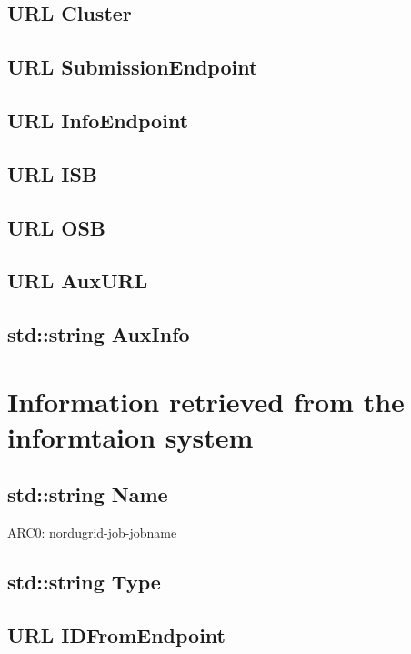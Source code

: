 \documentclass{book}
\begin{document}
\subsection*{URL Cluster}

\subsection*{URL SubmissionEndpoint}

\subsection*{URL InfoEndpoint}

\subsection*{URL ISB}

\subsection*{URL OSB}

\subsection*{URL AuxURL}

\subsection*{std::string AuxInfo}

\section{Information retrieved from the informtaion system}

\subsection*{std::string Name}

ARC0: nordugrid-job-jobname

\subsection*{std::string Type}

\subsection*{URL IDFromEndpoint}
\end{document}
